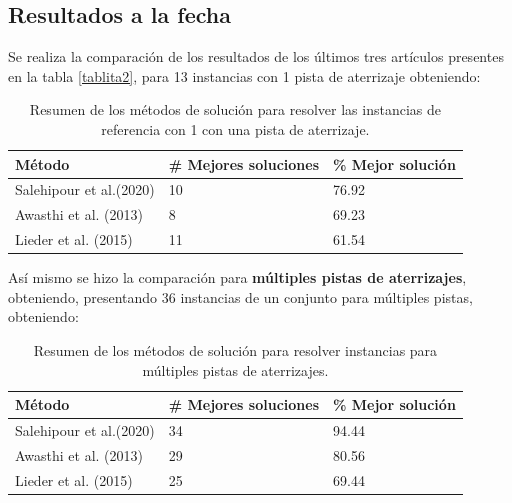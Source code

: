 \documentclass[letter, 10pt]{article}
\begin{document}
\subsection{Resultados a la fecha}

Se realiza la comparación de los resultados de los últimos tres artículos presentes en la tabla \ref{tablita2}, para 13 instancias con 1 pista de aterrizaje obteniendo:

\begin{table}[h]
\centering
\begin{tabular}{|l|l|l|}
\hline
Método                  & \textbf{\# Mejores soluciones} & \textbf{\% Mejor solución} \\ \hline
Salehipour et al.(2020) \cite{SALEHIPOUR2020179} & 10                             & 76.92                      \\ \hline
Awasthi et al. (2013) \cite{2013}   & 8                              & 69.23                      \\ \hline
Lieder et al. (2015) \cite{2015}   & 11                             & 61.54                      \\ \hline
\end{tabular}
\caption{Resumen de los métodos de solución para resolver las instancias de referencia con 1 con una pista de aterrizaje. \cite{SALEHIPOUR2020179}}
\end{table}

Así mismo se hizo la comparación para \textbf{múltiples pistas de aterrizajes}, obteniendo, presentando 36 instancias de un conjunto para múltiples pistas, obteniendo:

\begin{table}[h]
\centering
\begin{tabular}{|l|l|l|}
\hline
Método                  & \textbf{\# Mejores soluciones} & \textbf{\% Mejor solución} \\ \hline
Salehipour et al.(2020) & 34                             & 94.44                      \\ \hline
Awasthi et al. (2013) \cite{2013}  & 29                             & 80.56                      \\ \hline
Lieder et al. (2015) \cite{2015}   & 25                             & 69.44                      \\ \hline
\end{tabular}
\caption{Resumen de los métodos de solución para resolver instancias para múltiples pistas de aterrizajes.\cite{SALEHIPOUR2020179}}
\end{table}
\end{document}
